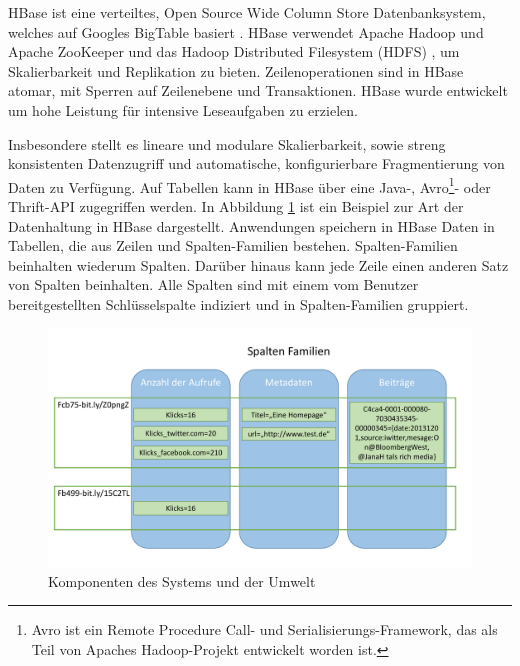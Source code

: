 HBase ist eine verteiltes, Open Source Wide Column Store Datenbanksystem, welches auf Googles BigTable basiert \cite{Chang:2006:BDS:1267308.1267323}. HBase verwendet Apache Hadoop und Apache ZooKeeper  \cite{Hunt:2010:ZWC:1855840.1855851} und das Hadoop Distributed Filesystem (HDFS) \cite{Shvachko:2010:HDF:1913798.1914427}, um Skalierbarkeit und Replikation zu bieten. Zeilenoperationen sind in HBase atomar, mit Sperren auf Zeilenebene und Transaktionen. HBase wurde entwickelt um hohe Leistung für intensive Leseaufgaben zu erzielen.

Insbesondere stellt es lineare und modulare Skalierbarkeit, sowie streng konsistenten Datenzugriff und automatische, konfigurierbare Fragmentierung von Daten zu Verfügung. Auf Tabellen kann in HBase über eine Java-, Avro\footnote{Avro ist ein Remote Procedure Call- und Serialisierungs-Framework, das als Teil von Apaches Hadoop-Projekt entwickelt worden ist.}- oder Thrift-API zugegriffen werden. In Abbildung \ref{db_hbase} ist ein Beispiel zur Art der Datenhaltung in HBase dargestellt. Anwendungen speichern in HBase Daten in Tabellen, die aus Zeilen und Spalten-Familien bestehen. Spalten-Familien beinhalten wiederum Spalten. Darüber hinaus kann jede Zeile einen anderen Satz von Spalten beinhalten. Alle Spalten sind mit einem vom Benutzer bereitgestellten Schlüsselspalte indiziert und in Spalten-Familien gruppiert.

\begin{figure}[htbp]
\centering
  \includegraphics[width=1.0\textwidth, width=1.0\textwidth]{pics/HBase.pdf}
\caption{Komponenten des Systems und der Umwelt}
\label{db_hbase}
\end{figure} 

